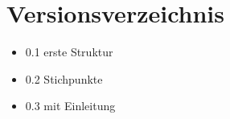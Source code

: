 \section{Versionsverzeichnis}

\begin{itemize}
    \item  0.1 erste Struktur
    \item 0.2 Stichpunkte
    \item 0.3 mit Einleitung
\end{itemize}
